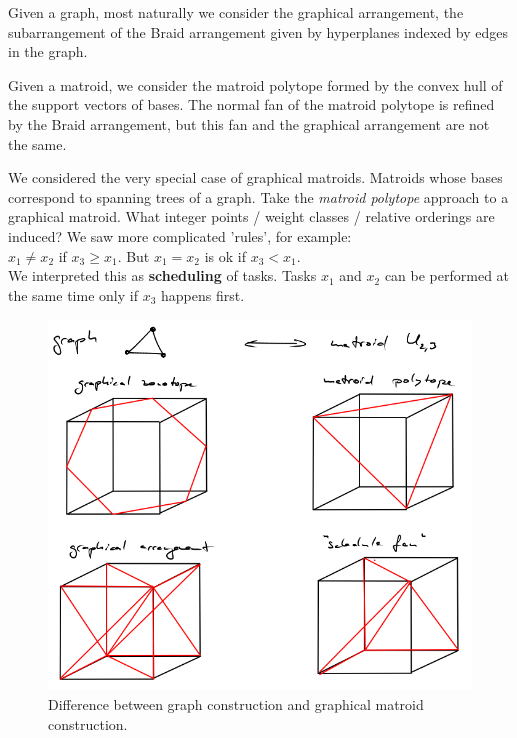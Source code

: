 \documentclass[12pt]{amsart}
\begin{document}
Given a graph, most naturally we consider the graphical arrangement,
the subarrangement of the Braid arrangement given by hyperplanes
indexed by edges in the graph.

Given a matroid, we consider the matroid polytope formed by the convex
hull of the support vectors of bases.  The normal fan of the matroid
polytope is refined by the Braid arrangement, but this fan and the
graphical arrangement are not the same.  

We considered the very special case of graphical matroids.  Matroids
whose bases correspond to spanning trees of a graph.  Take the
\emph{matroid polytope} approach to a graphical matroid.  What integer
points / weight classes / relative orderings are induced?  We saw more
complicated 'rules', for example:\\

$x_1 \neq x_2$ if $x_3 \geq x_1$.  But $x_1 = x_2$ is ok if $x_3 < x_1$.\\

We interpreted this as {\bf{scheduling}} of tasks.  Tasks $x_1$ and
$x_2$ can be performed  at the same time only if $x_3$ happens first.

\begin{figure}[h]
\includegraphics[width=13cm]{graph-matroid}
\caption{Difference between graph construction and graphical matroid construction.}
\end{figure}
\end{document}
